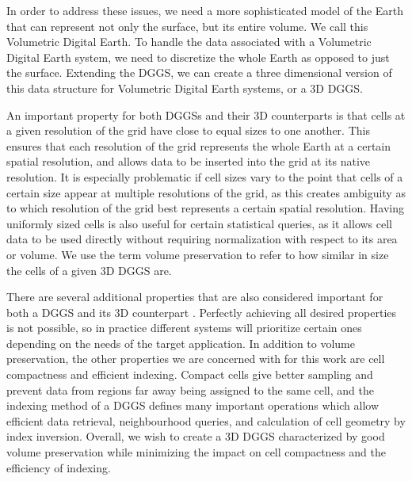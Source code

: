 In order to address these issues, we need a more sophisticated model of the Earth that can represent not only the surface, but its entire volume. We call this Volumetric Digital Earth. To handle the data associated with a Volumetric Digital Earth system, we need to discretize the whole Earth as opposed to just the surface. Extending the DGGS, we can create a three dimensional version of this data structure for Volumetric Digital Earth systems, or a 3D DGGS.

An important property for both DGGSs and their 3D counterparts is that cells at a given resolution of the grid have close to equal sizes to one another. This ensures that each resolution of the grid represents the whole Earth at a certain spatial resolution, and allows data to be inserted into the grid at its native resolution. It is especially problematic if cell sizes vary to the point that cells of a certain size appear at multiple resolutions of the grid, as this creates ambiguity as to which resolution of the grid best represents a certain spatial resolution. Having uniformly sized cells is also useful for certain statistical queries, as it allows cell data to be used directly without requiring normalization with respect to its area or volume. We use the term volume preservation to refer to how similar in size the cells of a given 3D DGGS are. 

There are several additional properties that are also considered important for both a DGGS and its 3D counterpart \cite{mahdavi2015survey, goodchild2018reimagining, sahr2003geodesic}. Perfectly achieving all desired properties is not possible, so in practice different systems will prioritize certain ones depending on the needs of the target application. In addition to volume preservation, the other properties we are concerned with for this work are cell compactness and efficient indexing. Compact cells give better sampling and prevent data from regions far away being assigned to the same cell, and the indexing method of a DGGS defines many important operations which allow efficient data retrieval, neighbourhood queries, and calculation of cell geometry by index inversion. Overall, we wish to create a 3D DGGS characterized by good volume preservation while minimizing the impact on cell compactness and the efficiency of indexing.

